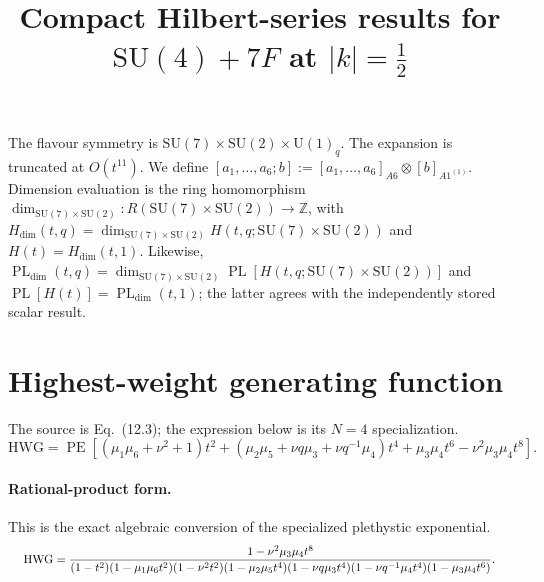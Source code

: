 \documentclass[10pt]{article}
\title{Compact Hilbert-series results for $\mathrm{SU(4)}+7F$ at $\lvert k\rvert=\frac{1}{2}$}
\date{}
\newcommand{\PE}{\operatorname{PE}}
\begin{document}
\maketitle
The flavour symmetry is $\mathrm{SU}(7)\times\mathrm{SU}(2)\times\mathrm{U}(1)_{q}$.
The expansion is truncated at $O(t^{11})$.  We define
$[a_1,\ldots,a_{6};b]:=[a_1,\ldots,a_{6}]_{A6}\otimes[b]_{A1^{(1)}}$.
Dimension evaluation is the ring homomorphism
$\dim_{\mathrm{SU}(7)\times\mathrm{SU}(2)}:R(\mathrm{SU}(7)\times\mathrm{SU}(2))\to\mathbb{Z}$, with
$H_{\mathrm{dim}}(t,q)=\dim_{\mathrm{SU}(7)\times\mathrm{SU}(2)}H(t,q;\mathrm{SU}(7)\times\mathrm{SU}(2))$
and $H(t)=H_{\mathrm{dim}}(t,1)$. Likewise,
$\operatorname{PL}_{\mathrm{dim}}(t,q)=\dim_{\mathrm{SU}(7)\times\mathrm{SU}(2)}
\operatorname{PL}[H(t,q;\mathrm{SU}(7)\times\mathrm{SU}(2))]$ and
$\operatorname{PL}[H(t)]=\operatorname{PL}_{\mathrm{dim}}(t,1)$;
the latter agrees with the independently stored scalar result.


\section{Highest-weight generating function}
The source is Eq.~(12.3); the expression below is its $N=4$ specialization.
\begin{equation}
\mathrm{HWG}=\PE\!\left[(\mu_1\mu_6+\nu^2+1)t^2
+(\mu_2\mu_5+\nu q\mu_3+\nu q^{-1}\mu_4)t^4
+\mu_3\mu_4t^6-\nu^2\mu_3\mu_4t^8\right].
\end{equation}
\paragraph{Rational-product form.} This is the exact algebraic conversion of the specialized plethystic exponential.
\begin{equation}
\resizebox{0.98\linewidth}{!}{${\displaystyle
\mathrm{HWG}=\frac{1-\nu^2\mu_3\mu_4t^8}
{(1-t^2)(1-\mu_1\mu_6t^2)(1-\nu^2t^2)
 (1-\mu_2\mu_5t^4)(1-\nu q\mu_3t^4)
 (1-\nu q^{-1}\mu_4t^4)(1-\mu_3\mu_4t^6)}.}$}
\end{equation}
\end{document}
